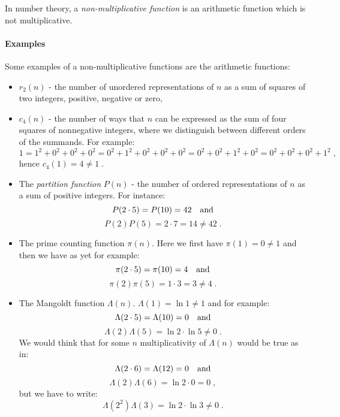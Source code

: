 \documentclass[12pt]{article}
\begin{document}

In  number theory, a {\it non-multiplicative function} is an arithmetic function  which is not multiplicative.

\paragraph{Examples}

Some examples of a non-multiplicative functions are the arithmetic functions:

\begin{itemize}
\item $r_{2}(n)$ - the number of unordered representations of $n$ as a sum of squares of two integers, positive, negative or zero,
\item $c_{4}(n)$ - the number of ways that $n$ can be expressed as the sum of four squares of nonnegative integers, where we distinguish between different orders of the summands. For example:
$$ 1 = 1^{2}+0^{2}+0^{2}+0^{2} = 0^{2}+1^{2}+0^{2}+0^{2}+0^{2} = 0^{2}+0^{2}+1^{2}+0^{2} = 0^{2} + 0^{2} + 0^{2} + 1^{2} \; ,$$
hence $c_{4}(1)=4 \ne 1 \; .$
\item The {\it partition function} $P(n)$ - the number of ordered representations of $n$ as a sum of positive integers. For instance:
$$ P(2 \cdot 5) = P(10) = 42 \quad \hbox{and} $$
$$ P(2) P(5) = 2 \cdot 7 = 14 \ne 42 \; . $$
\item The prime counting function $\pi(n)$. Here we first have $\pi(1) = 0 \ne 1$ and then we have as yet for example: 
$$ \pi(2 \cdot 5) = \pi(10) = 4 \quad \hbox{and} $$
$$ \pi(2) \pi(5) = 1 \cdot 3 = 3 \ne 4 \; . $$
\item The Mangoldt function $\Lambda(n)$. $\Lambda(1) = \ln 1 \ne 1$ and for example: 
$$ \Lambda(2 \cdot 5) = \Lambda(10) = 0 \quad \hbox{and} $$
$$ \Lambda(2) \Lambda(5) = \ln 2 \cdot \ln 5 \ne 0 \; . $$
We would think that for some $n$ multiplicativity of $\Lambda(n)$ would be true as in:
$$ \Lambda(2 \cdot 6) = \Lambda(12) = 0 \quad \hbox{and} $$
$$ \Lambda(2) \Lambda(6) = \ln 2 \cdot 0 = 0 \; , $$
but we have to write:
$$ \Lambda(2^{2}) \Lambda(3) = \ln 2 \cdot \ln 3 \ne 0 \; . $$
\end{itemize}
\end{document}
